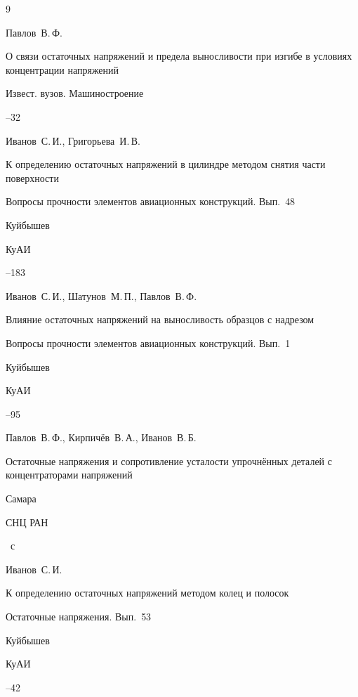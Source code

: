 \begin{thebibliography}{9}




\by Павлов~В.\,Ф.

\paper О связи остаточных напряжений и предела выносливости при изгибе в условиях концентрации напряжений

\jour Извест. вузов. Машиностроение



--32




\by Иванов~С.\,И., Григорьева~И.\,В.

\paper К определению остаточных напряжений в цилиндре методом снятия части поверхности

\inbook Вопросы прочности элементов авиационных конструкций. Вып.~{\rm 48}

\publaddr Куйбышев

\publ КуАИ


--183




\by Иванов~С.\,И., Шатунов~М.\,П., Павлов~В.\,Ф.

\paper Влияние остаточных напряжений на выносливость образцов с надрезом

\inbook Вопросы прочности элементов авиационных конструкций. Вып.~{\rm 1}

\publaddr Куйбышев

\publ КуАИ


--95




\by Павлов~В.\,Ф., Кирпич\"ев~В.\,А., Иванов~В.\,Б. 

\book Остаточные напряжения и сопротивление усталости упрочн\"енных деталей с концентраторами напряжений 

\publaddr Самара 

\publ СНЦ РАН 


~с




\by Иванов~С.\,И.

\paper К определению остаточных напряжений методом колец и полосок

\inbook Остаточные напряжения. Вып.~{\rm 53}

\publaddr Куйбышев

\publ КуАИ


--42



\end{thebibliography}





\makeengtitlem





%


